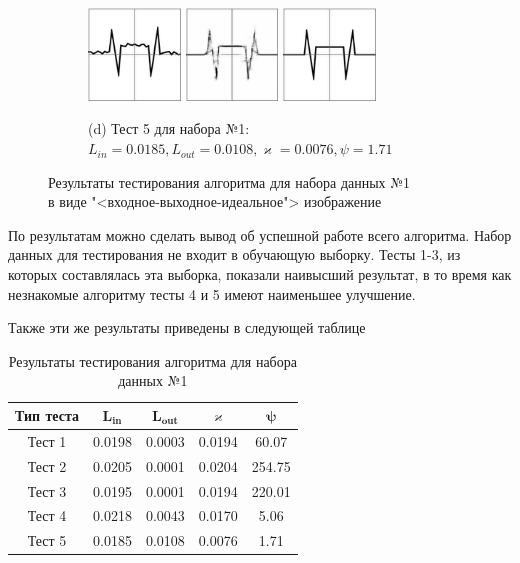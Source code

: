 \documentclass[12pt, a4paper]{article}
\renewcommand{\kappa}{\varkappa}
\begin{document}
\begin{figure}[!hp]
	\begin{subfigure}{\textwidth}
		\centering
		\includegraphics[width=0.27\textwidth]{res_n1_9}
		\hfill
		\includegraphics[width=0.27\textwidth]{res_n1_10}
		\hfill
		\includegraphics[width=0.27\textwidth]{5}
		\caption*{\small (d) Тест 5 для набора №1: $L_{in} = 0.0185,
		L_{out} = 0.0108, 
		\kappa = 0.0076,
		\psi = 1.71$}
	\end{subfigure}
	\caption{Результаты тестирования алгоритма для набора данных №1\\ в виде "<входное-выходное-идеальное"> изображение}
\end{figure}

По результатам можно сделать вывод об успешной работе всего алгоритма. Набор данных для тестирования не входит в обучающую выборку. Тесты 1-3, из которых составлялась эта выборка, показали наивысший результат, в то время как незнакомые алгоритму тесты 4 и 5 имеют наименьшее улучшение.

 Также эти же результаты приведены в следующей таблице
\begin{table}[!ht]
	\centering
	\caption{Результаты тестирования алгоритма для набора данных №1}
	\begin{tabular}{|c|c|c|c|c|}
		\hline
		\textbf{Тип теста} & \(\mathbf{L_{in}}\) & \(\mathbf{L_{out}}\) & \(\mathbf{\kappa}\) & \(\mathbf{\psi}\) \\ \hline
		Тест 1 & 0.0198 & 0.0003 & 0.0194 & 60.07 \\ \hline
		Тест 2 & 0.0205 & 0.0001 & 0.0204 & 254.75 \\ \hline
		Тест 3 & 0.0195 & 0.0001 & 0.0194 & 220.01 \\ \hline
		Тест 4 & 0.0218 & 0.0043 & 0.0170 & 5.06 \\ \hline
		Тест 5 & 0.0185 & 0.0108 & 0.0076 & 1.71 \\ \hline
	\end{tabular}
	\label{tab:results}
\end{table}
\end{document}
